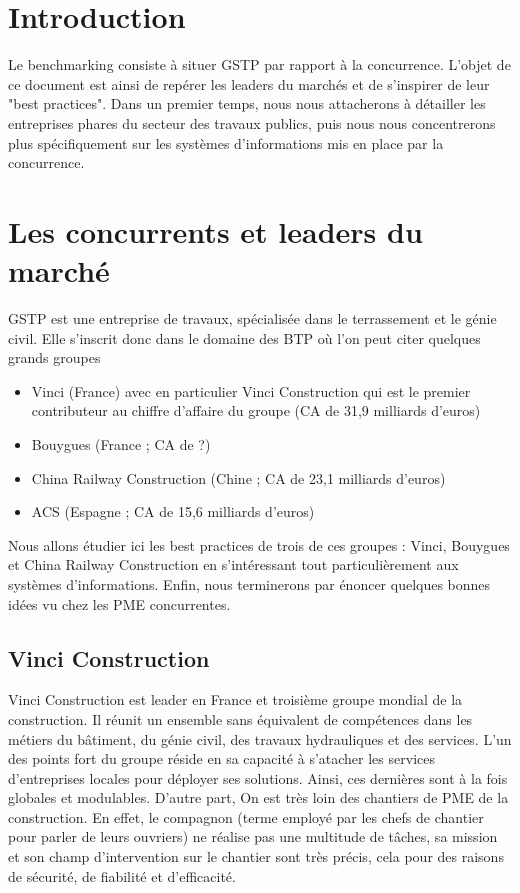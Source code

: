 \section{Introduction}

Le benchmarking consiste à situer GSTP par rapport à la concurrence. L'objet de ce document est ainsi de repérer les leaders du marchés et de s'inspirer de leur "best practices". 
Dans un premier temps, nous nous attacherons à détailler les entreprises phares du secteur des travaux publics, puis nous nous concentrerons plus spécifiquement sur les systèmes d'informations mis en place par la concurrence.

\section{Les concurrents et leaders du marché}
GSTP est une entreprise de travaux, spécialisée dans le terrassement et le génie civil.
Elle s'inscrit donc dans le domaine des BTP où l'on peut citer quelques grands groupes
\begin{itemize}
    \item Vinci (France) avec en particulier Vinci Construction qui est le premier contributeur au chiffre d'affaire du groupe (CA de 31,9 milliards d'euros)
    \item Bouygues (France ; CA de ?)
    \item China Railway Construction (Chine ; CA de 23,1 milliards d'euros)
	\item ACS (Espagne ; CA de 15,6 milliards d'euros)
\end{itemize}

Nous allons étudier ici les best practices de trois de ces groupes : Vinci, Bouygues et China Railway Construction en s'intéressant tout particulièrement aux systèmes d'informations. Enfin, nous terminerons par énoncer quelques bonnes idées vu chez les PME concurrentes.

\subsection{Vinci Construction}
Vinci Construction est leader en France et troisième groupe mondial de la construction.
Il réunit un ensemble sans équivalent de compétences dans les métiers du bâtiment, du génie civil, des travaux hydrauliques et des services.
L'un des points fort du groupe réside en sa capacité à s'atacher les services d'entreprises locales pour déployer ses solutions. Ainsi, ces dernières sont à la fois globales et modulables.
D'autre part, On est très loin des chantiers de PME de la construction. 
En effet, le compagnon (terme employé par les chefs de chantier pour parler de leurs ouvriers) ne réalise pas une multitude de tâches, sa mission et son champ d'intervention sur le chantier sont très précis, cela pour des raisons de sécurité, de fiabilité et d'efficacité.

